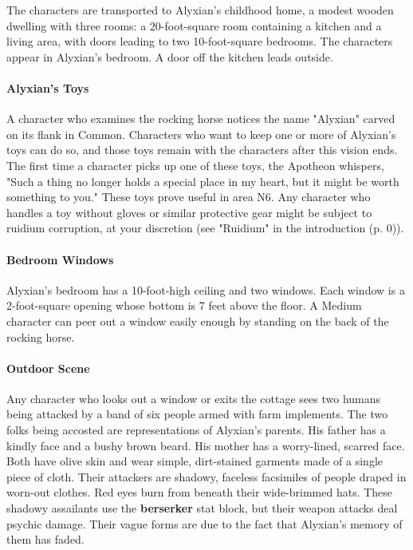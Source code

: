\documentclass[letterpaper, 11pt, bg=full, twocolumn]{dndbook}
\begin{document}
The characters are transported to Alyxian's childhood home, a modest wooden dwelling with three rooms: a 20-foot-square room containing a kitchen and a living area, with doors leading to two 10-foot-square bedrooms. The characters appear in Alyxian's bedroom. A door off the kitchen leads outside.


\paragraph{Alyxian's Toys}

A character who examines the rocking horse notices the name "Alyxian" carved on its flank in Common. Characters who want to keep one or more of Alyxian's toys can do so, and those toys remain with the characters after this vision ends. The first time a character picks up one of these toys, the Apotheon whispers, "Such a thing no longer holds a special place in my heart, but it might be worth something to you." These toys prove useful in area N6. Any character who handles a toy without gloves or similar protective gear might be subject to ruidium corruption, at your discretion (see "Ruidium" in the introduction (p. 0)).

\paragraph{Bedroom Windows}

Alyxian's bedroom has a 10-foot-high ceiling and two windows. Each window is a 2-foot-square opening whose bottom is 7 feet above the floor. A Medium character can peer out a window easily enough by standing on the back of the rocking horse.

\paragraph{Outdoor Scene}

Any character who looks out a window or exits the cottage sees two humans being attacked by a band of six people armed with farm implements. The two folks being accosted are representations of Alyxian's parents. His father has a kindly face and a bushy brown beard. His mother has a worry-lined, scarred face. Both have olive skin and wear simple, dirt-stained garments made of a single piece of cloth. Their attackers are shadowy, faceless facsimiles of people draped in worn-out clothes. Red eyes burn from beneath their wide-brimmed hats. These shadowy assailants use the \textbf{berserker} stat block, but their weapon attacks deal psychic damage. Their vague forms are due to the fact that Alyxian's memory of them has faded.
\end{document}

